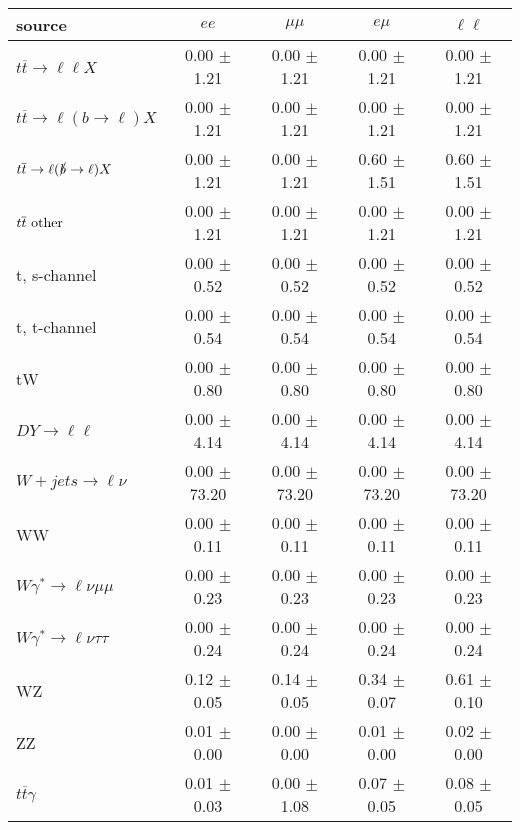 \begin{tabular}{l|cccc} \hline\hline
source & $ee$ & $\mu\mu$ & $e\mu$ & $\ell\ell $ \\
\hline
$t\overline{t} \rightarrow \ell \ell X$ &  0.00 $\pm$  1.21 &  0.00 $\pm$  1.21 &  0.00 $\pm$  1.21 &  0.00 $\pm$  1.21 \\
$t\overline{t} \rightarrow \ell (b \rightarrow \ell) X$ &  0.00 $\pm$  1.21 &  0.00 $\pm$  1.21 &  0.00 $\pm$  1.21 &  0.00 $\pm$  1.21 \\
$t\overline{t} \rightarrow \ell (\slashed b \rightarrow \ell) X$ &  0.00 $\pm$  1.21 &  0.00 $\pm$  1.21 &  0.60 $\pm$  1.51 &  0.60 $\pm$  1.51 \\
        $t\overline{t}\ \rm{other}$ &  0.00 $\pm$  1.21 &  0.00 $\pm$  1.21 &  0.00 $\pm$  1.21 &  0.00 $\pm$  1.21 \\
\hline
                       t, s-channel &  0.00 $\pm$  0.52 &  0.00 $\pm$  0.52 &  0.00 $\pm$  0.52 &  0.00 $\pm$  0.52 \\
                       t, t-channel &  0.00 $\pm$  0.54 &  0.00 $\pm$  0.54 &  0.00 $\pm$  0.54 &  0.00 $\pm$  0.54 \\
                                 tW &  0.00 $\pm$  0.80 &  0.00 $\pm$  0.80 &  0.00 $\pm$  0.80 &  0.00 $\pm$  0.80 \\
\hline
         $DY \rightarrow \ell \ell$ &  0.00 $\pm$  4.14 &  0.00 $\pm$  4.14 &  0.00 $\pm$  4.14 &  0.00 $\pm$  4.14 \\
      $W+jets \rightarrow \ell \nu$ &  0.00 $\pm$ 73.20 &  0.00 $\pm$ 73.20 &  0.00 $\pm$ 73.20 &  0.00 $\pm$ 73.20 \\
                                 WW &  0.00 $\pm$  0.11 &  0.00 $\pm$  0.11 &  0.00 $\pm$  0.11 &  0.00 $\pm$  0.11 \\
\hline
$W\gamma^{*} \rightarrow \ell \nu \mu\mu$ &  0.00 $\pm$  0.23 &  0.00 $\pm$  0.23 &  0.00 $\pm$  0.23 &  0.00 $\pm$  0.23 \\
$W\gamma^{*} \rightarrow \ell \nu \tau\tau$ &  0.00 $\pm$  0.24 &  0.00 $\pm$  0.24 &  0.00 $\pm$  0.24 &  0.00 $\pm$  0.24 \\
                                 WZ &  0.12 $\pm$  0.05 &  0.14 $\pm$  0.05 &  0.34 $\pm$  0.07 &  0.61 $\pm$  0.10 \\
                                 ZZ &  0.01 $\pm$  0.00 &  0.00 $\pm$  0.00 &  0.01 $\pm$  0.00 &  0.02 $\pm$  0.00 \\
\hline
              $t\overline{t}\gamma$ &  0.01 $\pm$  0.03 &  0.00 $\pm$  1.08 &  0.07 $\pm$  0.05 &  0.08 $\pm$  0.05 \\

\end{tabular}
